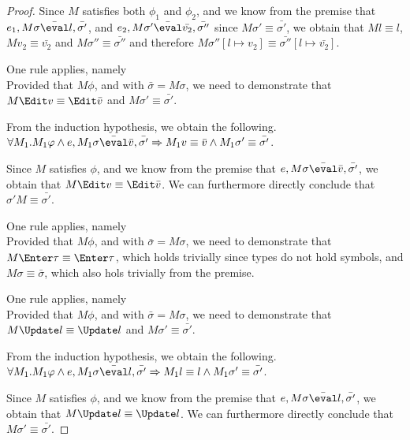 \begin{proof}
{  Since $M$ satisfies both $\phi_1$ and $\phi_2$,
  and we know from the premise that $e_1,M\sigma \bar{\eval}l,\bar{\sigma'}$,
  and $e_2,M\sigma'\bar{\eval}\bar{v_2},\bar{\sigma''}$ since $M\sigma'\equiv \bar{\sigma'}$,
  we obtain that $M l\equiv l$, $M v_2 \equiv \bar{v_2}$ and $M\sigma''\equiv\bar{\sigma''}$ and therefore $M\sigma''[l\mapsto v_2]\equiv\bar{\sigma''}[l\mapsto\bar{v_2}]$.
  }

  {One rule applies, namely \\
  Provided that $M\phi$, and  with $\bar{\sigma}=M\sigma$,
  we need to demonstrate that $M \Edit v \equiv \Edit \bar{v}$ and $M\sigma'\equiv\bar{\sigma'}$.

  From the induction hypothesis, we obtain the following.\\
  $\forall M_1 .  M_1\phi \land e, M_1\sigma \bar{\eval}\bar{v},\bar{\sigma'}\implies  M_1v\equiv \bar{v} \land  M_1\sigma'\equiv\bar{\sigma'}$.

  Since $M$ satisfies $\phi$,
  and we know from the premise that $e,M\sigma \bar{\eval}\bar{v},\bar{\sigma'}$,
  we obtain that $M \Edit v\equiv \Edit \bar{v}$.
  We can furthermore directly conclude that $\sigma' M\equiv\bar{\sigma'}$.

  }

  {
  One rule applies, namely \\
  Provided that $M\phi$, and  with $\bar{\sigma}=M\sigma$,
  we need to demonstrate that $M \Enter \tau \equiv \Enter \tau$, which holds trivially since types do not hold symbols,
  and $M\sigma\equiv\bar{\sigma}$, which also hols trivially from the premise.
  }

  {One rule applies, namely \\
  Provided that $M\phi$, and  with $\bar{\sigma}=M\sigma$,
  we need to demonstrate that $M \Update l \equiv \Update l$ and $M\sigma'\equiv\bar{\sigma'}$.

  From the induction hypothesis, we obtain the following.\\
  $\forall M_1 .  M_1\phi \land e, M_1\sigma \bar{\eval}l,\bar{\sigma'}\implies  M_1 l\equiv l \land  M_1\sigma'\equiv\bar{\sigma'}$.

  Since $M$ satisfies $\phi$,
  and we know from the premise that $e,M\sigma \bar{\eval}l,\bar{\sigma'}$,
  we obtain that $M \Update l\equiv \Update l$.
  We can furthermore directly conclude that $M \sigma' \equiv\bar{\sigma'}$.

}
\end{proof}
